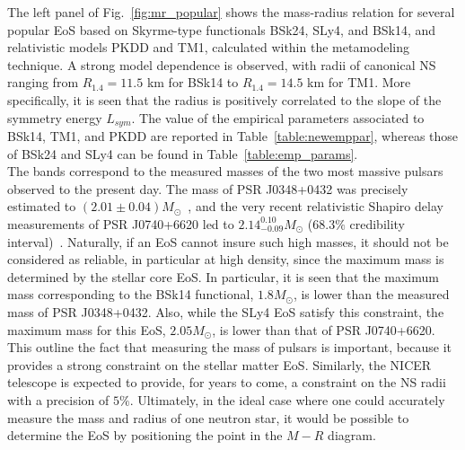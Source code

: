 The left panel of Fig.~\ref{fig:mr_popular} shows the mass-radius relation for 
several popular EoS based on Skyrme-type functionals BSk24, SLy4, and BSk14, 
and relativistic models PKDD and TM1, calculated within the metamodeling 
technique. A strong model dependence is observed, with radii of canonical NS 
ranging from $R_{1.4}=11.5$ km for BSk14 to $R_{1.4}=14.5$ km for TM1. More
specifically, it is seen that the radius is positively correlated to the slope 
of the symmetry energy $L_{sym}$. The value of the empirical parameters 
associated to BSk14, TM1, and PKDD are reported in Table~\ref{table:newemppar}, 
whereas those of BSk24 and SLy4 can be found in Table~\ref{table:emp_params}.\\
The bands correspond to the measured masses of the two most massive
pulsars observed to the present day. The mass of PSR J0348+0432 was precisely 
estimated to $(2.01\pm 0.04)M_\odot$~\cite{Antoniadis2013}, and the very recent
relativistic Shapiro delay measurements of PSR J0740+6620 led to 
$2.14_{-0.09}^{0.10}M_\odot$ ($68.3\%$ credibility
interval)~\cite{Cromartie2020}. Naturally, if an
EoS cannot insure such high masses, it should not be considered as reliable, 
in particular at high density, since the maximum mass is determined by the 
stellar core EoS. In particular, it is seen that the maximum mass corresponding
to the BSk14 functional, $1.8M_\odot$, is lower than the measured mass
of PSR J0348+0432. Also, while the SLy4 EoS satisfy this constraint, the maximum 
mass for this EoS, $2.05M_\odot$, is lower than that of PSR J0740+6620. This 
outline the fact that measuring the mass of pulsars is important, because it 
provides a strong constraint on the stellar matter EoS. Similarly, the NICER
telescope is expected to provide, for years to come, a constraint on the NS
radii with a precision of $5\%$. Ultimately, in the ideal case where one could 
accurately measure the mass and radius of one neutron star, it would be 
possible to determine the EoS by positioning the point in the $M-R$ diagram.

